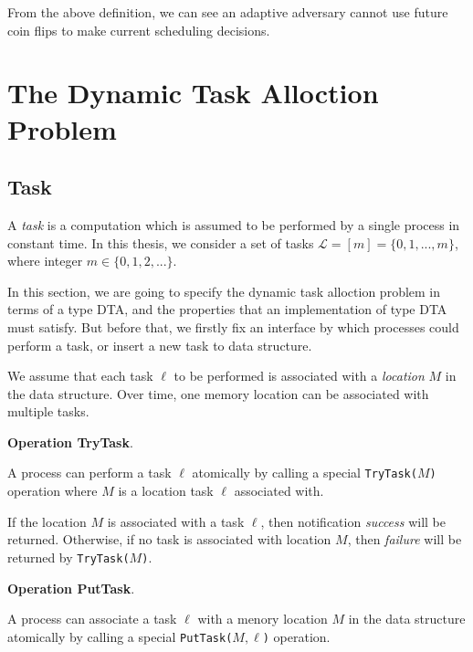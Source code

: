 From the above definition, we can see an adaptive adversary cannot use
future coin flips to make current scheduling decisions.

\section{The Dynamic Task Alloction Problem}

\subsection{Task}

A \emph{task} is a computation which is assumed to be performed by a single process in constant time\cite{georgiou2007all}.
In this thesis, we consider a set of tasks $\mathcal{L} = [m] = \{0, 1, ..., m\}$, where integer $m \in \{0, 1, 2, ...\}$.

In this section, we are going to specify the dynamic task alloction problem in terms of a type DTA, and the properties
that an implementation of type DTA must satisfy. But before that, we firstly fix an interface by which processes could
perform a task, or insert a new task to data structure.

We assume that each task $\ell$ to be performed is associated with a \emph{location} $M$
in the data structure. Over time, one memory location can be associated with multiple tasks.

\textbf{Operation TryTask}.

A process can perform a task $\ell$ atomically by calling a special
\texttt{TryTask(}$M$\texttt{)} operation where $M$ is a location task $\ell$
associated with.

If the location $M$ is associated with a task $\ell$, then notification \emph{success} will be returned.
Otherwise, if no task is associated with location $M$, then \emph{failure} will be returned by \texttt{TryTask(}$M$\texttt{)}.


\textbf{Operation PutTask}.

A process can associate a task $\ell$ with a menory location $M$ in the data structure
atomically by calling a special \texttt{PutTask(}$M,\ell$\texttt{)} operation.

